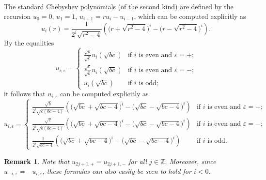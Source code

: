 \documentclass{amsart}
\newtheorem{remark}[theorem]{Remark}
\numberwithin{theorem}{section}
\newcommand{\ZZ}{\mathbb{Z}}
\begin{document}
  The standard Chebyshev polynomials (of the second kind) are defined by the recursion $u_0=0$, $u_1=1$, $u_{i+1}=ru_i-u_{i-1}$, which can be computed explicitly as
  \[u_i(r)=\frac{1}{2^i\sqrt{r^2-4}}\left(\big(r+\sqrt{r^2-4}\big)^i-\big(r-\sqrt{r^2-4}\big)^i\right).\]
  By the equalities 
  \[u_{i,\varepsilon}=\begin{cases} \frac{\sqrt{b}}{\sqrt{c}}u_i(\sqrt{bc}) & \text{if $i$ is even and $\varepsilon=+$;}\\ \frac{\sqrt{c}}{\sqrt{b}}u_i(\sqrt{bc}) & \text{if $i$ is even and $\varepsilon=-$;}\\ u_i(\sqrt{bc}) & \text{if $i$ is odd;} \end{cases}\]
  it follows that $u_{i,\varepsilon}$ can be computed explicitly as
  \[u_{i,\varepsilon}=\begin{cases} \frac{\sqrt{b}}{2^i\sqrt{c(bc-4)}}\left(\big(\sqrt{bc}+\sqrt{bc-4}\big)^i-\big(\sqrt{bc}-\sqrt{bc-4}\big)^i\right) & \text{if $i$ is even and $\varepsilon=+$;}\\ \frac{\sqrt{c}}{2^i\sqrt{b(bc-4)}}\left(\big(\sqrt{bc}+\sqrt{bc-4}\big)^i-\big(\sqrt{bc}-\sqrt{bc-4}\big)^i\right) & \text{if $i$ is even and $\varepsilon=-$;}\\ \frac{1}{2^i\sqrt{bc-4}}\left(\big(\sqrt{bc}+\sqrt{bc-4}\big)^i-\big(\sqrt{bc}-\sqrt{bc-4}\big)^i\right) & \text{if $i$ is odd.} \end{cases}\]
  \begin{remark}
    Note that $u_{2j+1,+}=u_{2j+1,-}$ for all $j\in\ZZ$.
    Moreover, since $u_{-i,\varepsilon}=-u_{i,\varepsilon}$, these formulas can also easily be seen to hold for $i<0$.
  \end{remark}
\end{document}
